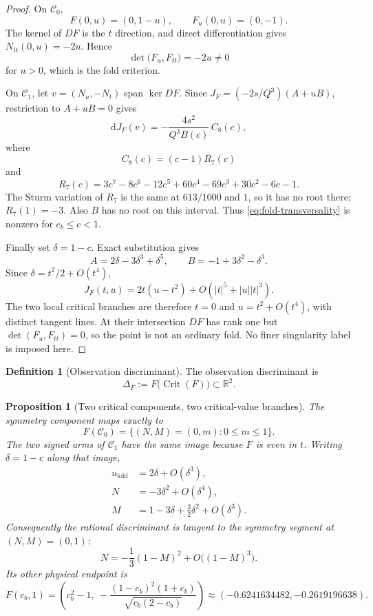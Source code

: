 \documentclass[11pt]{article}
\newtheorem{proposition}[theorem]{Proposition}
\theoremstyle{definition}
\newtheorem{definition}[theorem]{Definition}
\newcommand{\Csym}{\mathcal C_0}
\newcommand{\Crat}{\mathcal C_1}
\newcommand{\DiscF}{\Delta_F}
\begin{document}
\begin{proof}
On $\Csym$,
\[
F(0,u)=(0,1-u),\qquad F_u(0,u)=(0,-1).
\]
The kernel of $DF$ is the $t$ direction, and direct differentiation gives
$N_{tt}(0,u)=-2u$.  Hence
\[
\det\bigl(F_u,F_{tt}\bigr)=-2u\neq0
\]
for $u>0$, which is the fold criterion.

On $\Crat$, let $v=(N_u,-N_t)$ span $\ker DF$.  Since
$J_F=(-2s/Q^3)(A+uB)$, restriction to $A+uB=0$ gives
\begin{equation}\label{eq:fold-transversality}
\mathrm dJ_F(v)
=-\frac{4s^2}{Q^3B(c)}\,C_8(c),
\end{equation}
where
\[
C_8(c)=(c-1)R_7(c)
\]
and
\[
R_7(c)=3c^7-8c^6-12c^5+60c^4-69c^3+30c^2-6c-1.
\]
The Sturm variation of $R_7$ is the same at $613/1000$ and $1$, so it
has no root there; $R_7(1)=-3$.  Also $B$ has no root on this interval.
Thus \eqref{eq:fold-transversality} is nonzero for $c_b\leq c<1$.

Finally set $\delta=1-c$.  Exact substitution gives
\[
A=2\delta-3\delta^3+\delta^5,
\qquad
B=-1+3\delta^2-\delta^3.
\]
Since $\delta=t^2/2+O(t^4)$,
\begin{equation}\label{eq:degenerate-jacobian}
J_F(t,u)=2t(u-t^2)+O\!\left(|t|^5+|u||t|^3\right).
\end{equation}
The two local critical branches are therefore $t=0$ and
$u=t^2+O(t^4)$, with distinct tangent lines.  At their intersection
$DF$ has rank one but $\det(F_u,F_{tt})=0$, so the point is not an
ordinary fold.  No finer singularity label is imposed here.
\end{proof}

\begin{definition}[Observation discriminant]
\label{def:discriminant}
The observation discriminant is
\[
\DiscF:=F\bigl(\operatorname{Crit}(F)\bigr)\subset\mathbb R^2.
\]
\end{definition}

\begin{proposition}[Two critical components, two critical-value branches]
\label{prop:discriminant}
The symmetry component maps exactly to
\[
F(\Csym)=\{(N,M)=(0,m):0\leq m\leq1\}.
\]
The two signed arms of $\Crat$ have the same image because $F$ is even in
$t$.  Writing $\delta=1-c$ along that image,
\begin{align}
u_{\mathrm{fold}}&=2\delta+O(\delta^3),\\
N&=-3\delta^2+O(\delta^4),\\
M&=1-3\delta+\frac32\delta^2+O(\delta^3).
\end{align}
Consequently the rational discriminant is tangent to the symmetry segment at
$(N,M)=(0,1)$:
\begin{equation}\label{eq:discriminant-contact}
N=-\frac13(1-M)^2+O\bigl((1-M)^3\bigr).
\end{equation}
Its other physical endpoint is
\[
F(c_b,1)=
\left(
c_b^2-1,\
-\frac{(1-c_b)^2(1+c_b)}{\sqrt{c_b(2-c_b)}}
\right)
\approx(-0.6241634482,-0.2619196638).
\]
\end{proposition}
\end{document}
